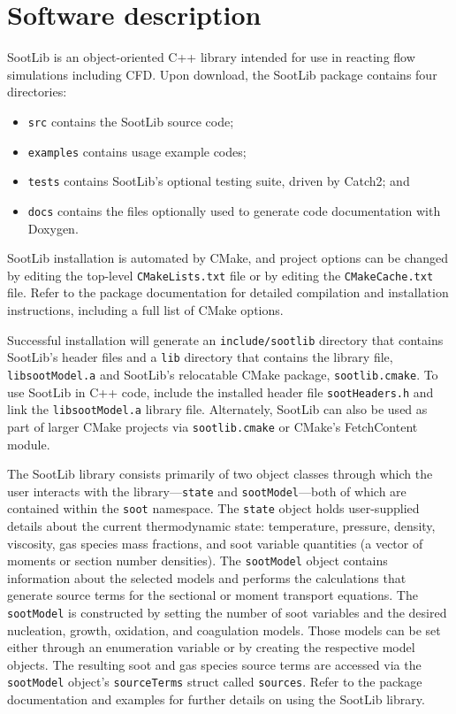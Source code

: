 \documentclass[preprint,letterpaper]{elsarticle}
\begin{document}

\section{Software description}
\label{s:architecture}

SootLib is an object-oriented C++ library intended for use in reacting flow simulations including CFD.
Upon download, the SootLib package contains four directories: 
%
\begin{itemize}
    \item \texttt{src} contains the SootLib source code; 
    \item \texttt{examples} contains usage example codes; 
    \item \texttt{tests} contains SootLib's optional testing suite, driven by Catch2; and 
    \item \texttt{docs} contains the files optionally used to generate code documentation with Doxygen.
\end{itemize}
%
SootLib installation is automated by CMake, and project options can be changed by editing the top-level \texttt{CMakeLists.txt} file or by editing the \texttt{CMakeCache.txt} file. Refer to the package documentation for detailed compilation and installation instructions, including a full list of CMake options.

Successful installation will generate an \texttt{include/sootlib} directory that contains SootLib's header files and a \texttt{lib} directory that contains the library file, \texttt{libsootModel.a} and SootLib's relocatable CMake package, \texttt{sootlib.cmake}.
To use SootLib in C++ code, include the installed header file \texttt{sootHeaders.h} and link the \texttt{libsootModel.a} library file. Alternately, SootLib can also be used as part of larger CMake projects via \texttt{sootlib.cmake} or CMake's FetchContent module.

The SootLib library consists primarily of two object classes through which the user interacts with the library---\texttt{state} and \texttt{sootModel}---both of which are contained within the \texttt{soot} namespace. The \texttt{state} object holds user-supplied details about the current thermodynamic state: temperature, pressure, density, viscosity, gas species mass fractions, and soot variable quantities (a vector of moments or section number densities). The \texttt{sootModel} object contains information about the selected models and performs the calculations that generate source terms for the sectional or moment transport equations. The \texttt{sootModel} is constructed by setting the number of soot variables and the desired nucleation, growth, oxidation, and coagulation models. Those models can be set either through an enumeration variable or by creating the respective model objects.
The resulting soot and gas species source terms are accessed via the \texttt{sootModel} object's \texttt{sourceTerms} struct called \texttt{sources}. Refer to the package documentation and examples for further details on using the SootLib library.
\end{document}
